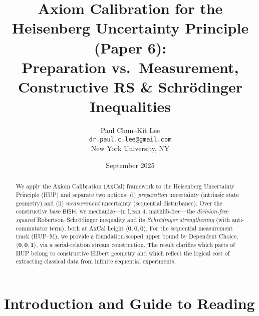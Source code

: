 \documentclass[11pt]{article}
\title{Axiom Calibration for the Heisenberg Uncertainty Principle (Paper 6):\\
Preparation vs.\ Measurement, Constructive RS \& Schrödinger Inequalities}
\author{Paul Chun--Kit Lee\\
\texttt{dr.paul.c.lee@gmail.com}\\
New York University, NY}
\date{September 2025}
\newcommand{\BISH}{\mathsf{BISH}}
\newcommand{\hzero}{\mathbf{0}}
\newcommand{\hone}{\mathbf{1}}
\newcommand{\allzero}{\langle \hzero,\hzero,\hzero\rangle}
\newcommand{\DCwonly}{\langle \hzero,\hzero,\hone\rangle}
\theoremstyle{plain}
\theoremstyle{definition}
\theoremstyle{remark}
\begin{document}
\maketitle

\begin{abstract}
We apply the Axiom Calibration (AxCal) framework to the Heisenberg Uncertainty Principle (HUP) and separate two notions: (i) \emph{preparation} uncertainty (intrinsic state geometry) and (ii) \emph{measurement} uncertainty (sequential disturbance).
Over the constructive base $\BISH$, we mechanize---in Lean 4, mathlib-free---the \emph{division-free squared} Robertson--Schrödinger inequality and its \emph{Schrödinger strengthening} (with anti-commutator term), both at AxCal height $\allzero$.
For the sequential measurement track (HUP--M), we provide a foundation-scoped upper bound by Dependent Choice, $\DCwonly$, via a serial-relation stream construction. The result clarifies which parts of HUP belong to constructive Hilbert geometry and which reflect the logical cost of extracting classical data from infinite sequential experiments.
\end{abstract}

\tableofcontents

\noindent{}

\section{Introduction and Guide to Reading}
\end{document}
